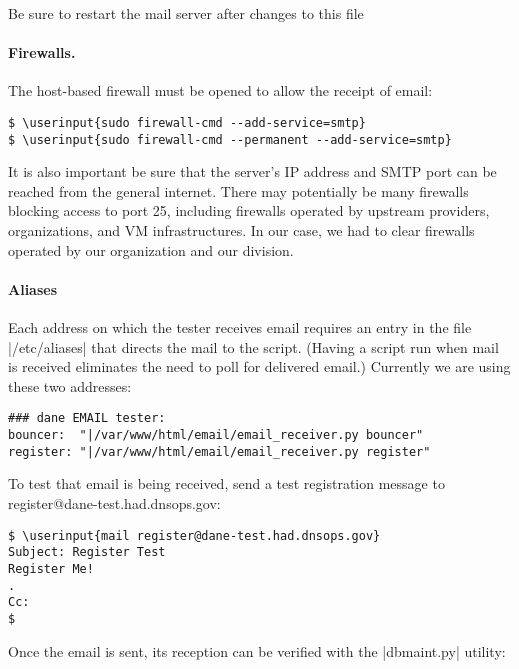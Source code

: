 \documentclass[preprint,3p,11pt]{elsarticle}
\newcommand\userinput[1]{\textbf{#1}}
\begin{document}
Be sure to restart the mail server after changes to this file

\paragraph{Firewalls.} The host-based firewall must be opened to allow the receipt of email:

\begin{Verbatim}[commandchars=\\\{\},fontsize=\small]
$ \userinput{sudo firewall-cmd --add-service=smtp}
$ \userinput{sudo firewall-cmd --permanent --add-service=smtp}
\end{Verbatim}

It is also important be sure that the server's IP address and SMTP
port can be reached from the general internet. There may potentially
be many firewalls blocking access to port 25, including firewalls
operated by upstream providers, organizations, and VM
infrastructures. In our case, we had to clear firewalls operated by
our organization and our division.

\paragraph{Aliases}

Each address on which the tester receives email requires an entry in
the file |/etc/aliases| that directs the mail to the script. (Having a
script run when mail is received eliminates the need to poll for
delivered email.)  Currently we are using these two addresses:

\begin{Verbatim}[commandchars=\\\{\},fontsize=\small]
### dane EMAIL tester:
bouncer:  "|/var/www/html/email/email_receiver.py bouncer"
register: "|/var/www/html/email/email_receiver.py register"
\end{Verbatim}

To test that email is being received, send a test registration message
to register@dane-test.had.dnsops.gov:

\begin{Verbatim}[commandchars=\\\{\},fontsize=\small]
$ \userinput{mail register@dane-test.had.dnsops.gov}
Subject: Register Test
Register Me!
.
Cc:
$
\end{Verbatim}

Once the email is sent, its reception can be verified with the
|dbmaint.py| utility:
\end{document}
